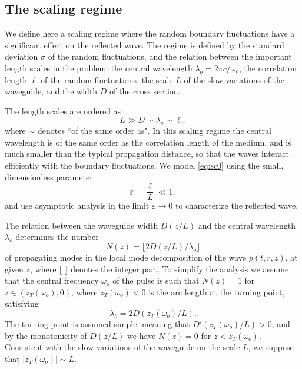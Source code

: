\documentclass[final]{siamltex}
\begin{document}
\subsection{The scaling regime}
\label{sect:form1p}
We define here a scaling regime where the random boundary fluctuations
have a significant effect on the reflected wave. The regime is defined
by the standard deviation $\sigma$ of the random fluctuations, and the
relation between the important length scales in the problem: the
central wavelength ${\lambda}_o = 2\pi c/{\omega}_o$, the correlation length $\ell$ of the
random fluctuations, the scale $L$ of the slow variations of the
waveguide, and the width $D$ of the cross section.

The length scales are ordered as 
\begin{equation}
L \gg D \sim {\lambda}_o \sim \ell,
\label{eq:sc0}
\end{equation}
where $\sim$ denotes ``of the same order as".
In this scaling regime the central wavelength is of the same order as the correlation
length of the medium,  and is much smaller than the typical propagation distance,
  so that the waves interact efficiently with the boundary fluctuations. We model
\eqref{eq:sc0} using the small, dimensionless parameter
\begin{equation}
{\varepsilon} = \frac{\ell}{L} \ll 1,
\label{eq:sc1}
\end{equation}
and use asymptotic analysis in the limit ${\varepsilon} \to 0$ to characterize
the reflected wave.

The relation between the waveguide width $D(z/L)$ and the central
wavelength ${\lambda}_o$ determines the number
\[
N(z) = \lfloor {2 D(z/L)}/{{\lambda}_o} \rfloor
\]
of propagating modes in the local mode decomposition of the wave
$p(t,r,z)$, at given $z$, where $\lfloor ~ \rfloor$ denotes
the integer part. To simplify the analysis we assume that the central
frequency ${\omega}_o$ of the pulse is such that $N(z) = 1$ for $z \in
(z_T({\omega}_o), 0)$, where $z_T({\omega}_o)<0$ is the arc length at the turning
point, satisfying
\begin{equation}
{\lambda}_o = 2 D\left({z_T({\omega}_o)}/{L}\right).
\label{eq:tp}
\end{equation}
The turning point is assumed simple, meaning that $D'(z_T({\omega}_o)/L) >
0$, and by the monotonicity of $D(z/L)$ we have $N(z) = 0$ for $ z <
z_T({\omega}_o)$.  Consistent with the slow variations of the waveguide on
the scale $L$, we suppose that $|z_T({\omega}_o)|  \sim L$.
\end{document}
